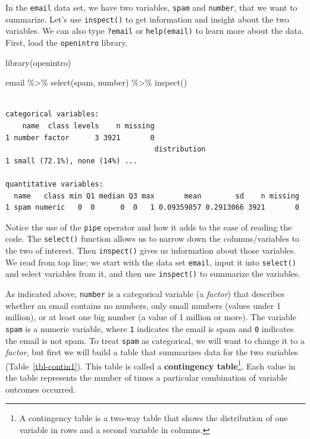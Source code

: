 \documentclass[
  letterpaper,
  DIV=11,
  numbers=noendperiod]{scrreprt}
\newenvironment{Shaded}{\begin{snugshade}}{\end{snugshade}}
\newcommand{\FunctionTok}[1]{\textcolor[rgb]{0.28,0.35,0.67}{#1}}
\newcommand{\NormalTok}[1]{\textcolor[rgb]{0.00,0.23,0.31}{#1}}
\newcommand{\SpecialCharTok}[1]{\textcolor[rgb]{0.37,0.37,0.37}{#1}}
\begin{document}
In the \texttt{email} data set, we have two variables, \texttt{spam} and
\texttt{number}, that we want to summarize. Let's use \texttt{inspect()}
to get information and insight about the two variables. We can also type
\texttt{?email} or \texttt{help(email)} to learn more about the data.
First, load the \texttt{openintro} library.

\begin{Shaded}
\begin{Highlighting}[]
\FunctionTok{library}\NormalTok{(openintro)}
\end{Highlighting}
\end{Shaded}

\begin{Shaded}
\begin{Highlighting}[]
\NormalTok{email }\SpecialCharTok{\%\textgreater{}\%}
  \FunctionTok{select}\NormalTok{(spam, number) }\SpecialCharTok{\%\textgreater{}\%}
  \FunctionTok{inspect}\NormalTok{()}
\end{Highlighting}
\end{Shaded}

\begin{verbatim}

categorical variables:  
    name  class levels    n missing
1 number factor      3 3921       0
                                   distribution
1 small (72.1%), none (14%) ...                

quantitative variables:  
  name   class min Q1 median Q3 max       mean        sd    n missing
1 spam numeric   0  0      0  0   1 0.09359857 0.2913066 3921       0
\end{verbatim}

Notice the use of the \texttt{pipe} operator and how it adds to the ease
of reading the code. The \texttt{select()} function allows us to narrow
down the columns/variables to the two of interest. Then
\texttt{inspect()} gives us information about those variables. We read
from top line; we start with the data set \texttt{email}, input it into
\texttt{select()} and select variables from it, and then use
\texttt{inspect()} to summarize the variables.

As indicated above, \texttt{number} is a categorical variable (a
\emph{factor}) that describes whether an email contains no numbers, only
small numbers (values under 1 million), or at least one big number (a
value of 1 million or more). The variable \texttt{spam} is a numeric
variable, where \texttt{1} indicates the email is spam and \texttt{0}
indicates the email is not spam. To treat \texttt{spam} as categorical,
we will want to change it to a \emph{factor}, but first we will build a
table that summarizes data for the two variables
(Table~\ref{tbl-contin1}). This table is called a \textbf{contingency
table}\footnote{A contingency table is a two-way table that shows the
  distribution of one variable in rows and a second variable in columns.}.
Each value in the table represents the number of times a particular
combination of variable outcomes occurred.
\end{document}
